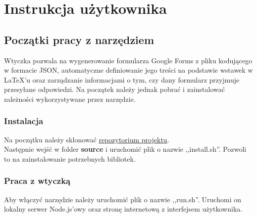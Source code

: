 
\chapter{Instrukcja użytkownika}
\section{Początki pracy  z narzędziem}
Wtyczka pozwala na wygenerowanie formularza Google Forms z pliku kodującego w formacie JSON, automatyczne definiowanie jego treści na podstawie wstawek w \LaTeX{}'u oraz zarządzanie informacjami o tym, czy dany formularz przyjmuje przesyłane odpowiedzi. Na początek należy jednak pobrać i zainstalować zależności wykorzystywane przez narzędzie.
\subsection{Instalacja}
Na początku należy sklonować \href{https://github.com/agnpawicka/pracaInzynierska/}{repozytorium projektu}.\\
Następnie wejść w folder \textbf{source} i uruchomić plik o nazwie ,,install.sh''. Pozwoli to na zainstalowanie potrzebnych bibliotek.
\subsection{Praca z wtyczką}
Aby włączyć narzędzie należy uruchomić plik o nazwie ,,run.sh''. Uruchomi on lokalny serwer Node.js'owy oraz stronę internetową z interfejsem użytkownika.

